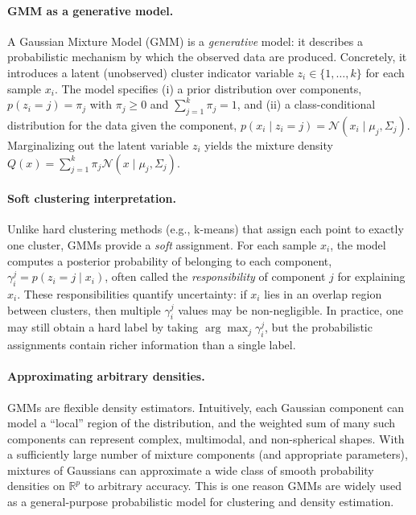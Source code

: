 \documentclass{article}
\begin{document}
\paragraph{GMM as a generative model.}
A Gaussian Mixture Model (GMM) is a \emph{generative} model: it describes a probabilistic mechanism by which the observed data are produced. Concretely, it introduces a latent (unobserved) cluster indicator variable $z_i \in \{1,\dots,k\}$ for each sample $x_i$. The model specifies (i) a prior distribution over components, $p(z_i=j)=\pi_j$ with $\pi_j \ge 0$ and $\sum_{j=1}^k \pi_j = 1$, and (ii) a class-conditional distribution for the data given the component, $p(x_i \mid z_i=j)=\mathcal{N}(x_i \mid \mu_j, \Sigma_j)$. Marginalizing out the latent variable $z_i$ yields the mixture density $Q(x)=\sum_{j=1}^k \pi_j \mathcal{N}(x \mid \mu_j, \Sigma_j)$.

\paragraph{Soft clustering interpretation.}
Unlike hard clustering methods (e.g., k-means) that assign each point to exactly one cluster, GMMs provide a \emph{soft} assignment. For each sample $x_i$, the model computes a posterior probability of belonging to each component,
$\gamma_i^j = p(z_i=j \mid x_i)$, often called the \emph{responsibility} of component $j$ for explaining $x_i$. These responsibilities quantify uncertainty: if $x_i$ lies in an overlap region between clusters, then multiple $\gamma_i^j$ values may be non-negligible. In practice, one may still obtain a hard label by taking $\arg\max_j \gamma_i^j$, but the probabilistic assignments contain richer information than a single label.

\paragraph{Approximating arbitrary densities.}
GMMs are flexible density estimators. Intuitively, each Gaussian component can model a “local” region of the distribution, and the weighted sum of many such components can represent complex, multimodal, and non-spherical shapes. With a sufficiently large number of mixture components (and appropriate parameters), mixtures of Gaussians can approximate a wide class of smooth probability densities on $\mathbb{R}^p$ to arbitrary accuracy. This is one reason GMMs are widely used as a general-purpose probabilistic model for clustering and density estimation.
\end{document}
